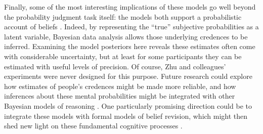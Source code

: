 \documentclass[
  english,
  man,floatsintext]{apa6}
\begin{document}
Finally, some of the most interesting implications of these models go well beyond the probability judgment task itself: the models both support a probabilistic account of beliefs \autocite{chater.etal2020}. Indeed, by representing the ``true'' subjective probabilities as a latent variable, Bayesian data analysis allows those underlying credences to be inferred. Examining the model posteriors here reveals these estimates often come with considerable uncertainty, but at least for some participants they can be estimated with useful levels of precision. Of course, Zhu and colleagues' \autocite*{zhu.etal2020} experiments were never designed for this purpose. Future research could explore how estimates of people's credences might be made more reliable, and how inferences about these mental probabilities might be integrated with other Bayesian models of reasoning \autocites[e.g.][]{franke.etal2016,jern.etal2014,griffiths.tenenbaum2006}. One particularly promising direction could be to integrate these models with formal models of belief revision, which might then shed new light on these fundamental cognitive processes \autocites[e.g.][]{cook.lewandowsky2016,jern.etal2014,powell.etal2018}.


\printbibliography
\end{document}
